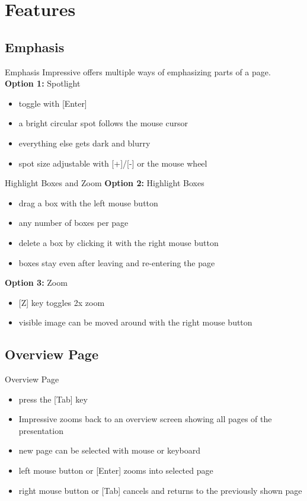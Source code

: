 \documentclass[bigger,hyperref={colorlinks=true,linkcolor=white,urlcolor=blue}]{beamer}
\begin{document}
\section{Features}

\subsection{Emphasis}
\begin{frame}{Emphasis}
    Impressive offers multiple ways of emphasizing parts of a page.
    \vspace{0.5cm} \\
    \textbf{Option 1:} {\glqq}Spotlight{\grqq}
    \begin{itemize}
        \item toggle with [Enter]
        \item a bright circular spot follows the mouse cursor
        \item everything else gets dark and blurry
        \item spot size adjustable with [+]/[-] or the mouse wheel
    \end{itemize}
\end{frame}
\begin{frame}{Highlight Boxes and Zoom}
    \textbf{Option 2:} Highlight Boxes
    \begin{itemize}
        \item drag a box with the left mouse button
        \item any number of boxes per page
        \item delete a box by clicking it with the right mouse button
        \item boxes stay even after leaving and re-entering the page
    \end{itemize}
    
    \textbf{Option 3:} Zoom
    \begin{itemize}
        \item {}[Z] key toggles 2x zoom
        \item visible image can be moved around with the right mouse button
    \end{itemize}
\end{frame}

\subsection{Overview Page}
\begin{frame}{Overview Page}
    \begin{itemize}
        \item press the [Tab] key
        \item Impressive zooms back to an overview screen showing all pages
              of the presentation
        \item new page can be selected with mouse or keyboard
        \item left mouse button or [Enter] zooms into selected page
        \item right mouse button or [Tab] cancels and returns to the previously
              shown page
    \end{itemize}
\end{frame}
\end{document}
